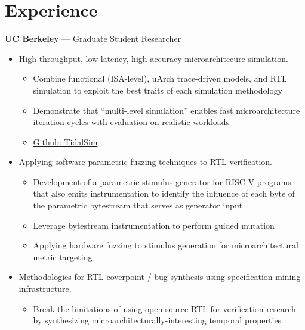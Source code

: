 \documentclass[10pt]{article}
\begin{document}
\section{Experience}
 \textbf{UC Berkeley} --- Graduate Student Researcher
\begin{itemize}
    \item High throughput, low latency, high accuracy microarchitecure simulation.
    \begin{itemize}
        \item Combine functional (ISA-level), uArch trace-driven models, and RTL simulation to exploit the best traits of each simulation methodology
        \item Demonstrate that ``multi-level simulation'' enables fast microarchitecture iteration cycles with evaluation on realistic workloads
        \item \href{https://github.com/euphoric-hardware/tidalsim}{Github: TidalSim}
    \end{itemize}
    \item Applying software parametric fuzzing techniques to RTL verification.
    \begin{itemize}
        \item Development of a parametric stimulus generator for RISC-V programs that also emits instrumentation to identify the influence of each byte of the parametric bytestream that serves as generator input
        \item Leverage bytestream instrumentation to perform guided mutation
        \item Applying hardware fuzzing to stimulus generation for microarchitectural metric targeting
    \end{itemize}
    \item Methodologies for RTL coverpoint / bug synthesis using specification mining infrastructure.
    \begin{itemize}
        \item Break the limitations of using open-source RTL for verification research by synthesizing microarchitecturally-interesting temporal properties

\end{itemize}
\end{itemize}
\end{document}
